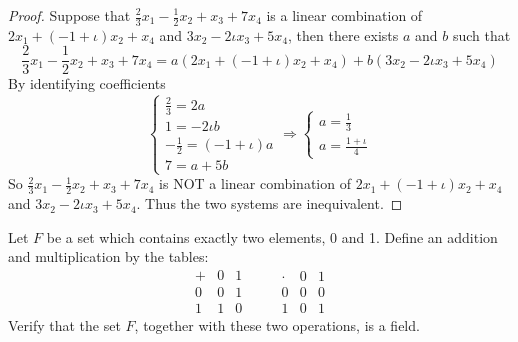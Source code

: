 \begin{proof}
    Suppose that $\frac{2}{3}x_{1} - \frac{1}{2}x_{2} + x_{3} + 7x_{4}$ is a linear combination of $2x_{1} + (-1 + \iota)x_{2} + x_{4}$ and $3x_{2} - 2\iota x_{3} + 5x_{4}$, then there exists $a$ and $b$ such that
    \[
        \frac{2}{3}x_{1} - \frac{1}{2}x_{2} + x_{3} + 7x_{4} = a(2x_{1} + (-1 + \iota)x_{2} + x_{4}) + b(3x_{2} - 2\iota x_{3} + 5x_{4})
    \]
    By identifying coefficients
    \[
        \begin{cases}
            \frac{2}{3} = 2a             \\
            1 = -2\iota b                \\
            -\frac{1}{2} = (-1 + \iota)a \\
            7 = a + 5b
        \end{cases}
        \Longrightarrow
        \begin{cases}
            a = \frac{1}{3} \\
            a = \frac{1 + \iota}{4}
        \end{cases}
    \]
    So $\frac{2}{3}x_{1} - \frac{1}{2}x_{2} + x_{3} + 7x_{4}$ is NOT a linear combination of $2x_{1} + (-1 + \iota)x_{2} + x_{4}$ and $3x_{2} - 2\iota x_{3} + 5x_{4}$. Thus the two systems are inequivalent.
\end{proof}

\begin{exercise}
    Let $F$ be a set which contains exactly two elements, 0 and 1. Define an addition and multiplication by the tables:
    \[
        \begin{array}{c|cc}
            + & 0 & 1 \\
            \hline
            0 & 0 & 1 \\
            1 & 1 & 0
        \end{array}
        \qquad
        \begin{array}{c|cc}
            \cdot & 0 & 1 \\
            \hline
            0     & 0 & 0 \\
            1     & 0 & 1
        \end{array}
    \]
    Verify that the set $F$, together with these two operations, is a field.
\end{exercise}

